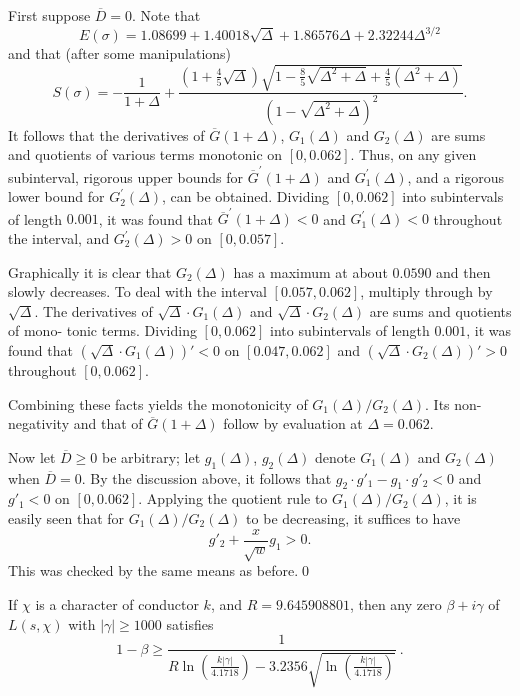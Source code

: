   First suppose  $\overline{D} = 0$.  Note that
$$ E(\sigma) = 1.08699 + 1.40018\sqrt{\Delta} + 1.86576\Delta +
2.32244\Delta^{3/2}
$$ and that (after some manipulations)
$$ S(\sigma) = -\frac{1}{1+\Delta} + \frac{\left(1 +
\frac{4}{5}\sqrt{\Delta}\right)\sqrt{1 -
\frac{8}{5}\sqrt{\Delta^2+\Delta} +
\frac{4}{5}\left(\Delta^2+\Delta\right)}}{\left(1 -
\sqrt{\Delta^2+\Delta}\right)^2}.
$$ It follows that the derivatives of 
$\overline{G}(1+\Delta)$, $G_1(\Delta)$  and 
$G_2(\Delta)$  are sums and quotients of various terms monotonic on 
$[0,0.062]$.  Thus, on any given subinterval, rigorous upper bounds
for  $\overline{G}^{\prime}(1+\Delta)$
 and  $G^{\prime}_1(\Delta)$, and a rigorous lower bound for 
$G^{\prime}_2(\Delta)$, can be obtained.  Dividing  $[0,0.062]$ 
into subintervals of length $0.001$, it was found that 
$\overline{G}^{\prime}(1+\Delta) < 0$ and  
$G^{\prime}_1(\Delta) < 0$  throughout the interval, and 
$G^{\prime}_2(\Delta) > 0$  on  $[0,0.057]$.

Graphically it is clear that  $G_2(\Delta)$  has a maximum at about 
$0.0590$  and then slowly decreases.  To deal with the interval 
$[0.057, 0.062]$, multiply through by 
$\sqrt{\Delta}$.  The derivatives of 
$\sqrt{\Delta}
\cdot G_1(\Delta)$  and  $\sqrt{\Delta} \cdot G_2(\Delta)$  are sums
and quotients of mono-\linebreak
tonic terms.  Dividing  $[0,0.062]$  into
subintervals of length  $0.001$, it was found that
\linebreak 
  $(\sqrt{\Delta}
\cdot G_1(\Delta))' < 0$  on  $[0.047,0.062]$  and  $(\sqrt{\Delta}
\cdot G_2(\Delta))' > 0$  throughout  $[0,0.062]$.

Combining these facts yields the monotonicity of 
$G_1(\Delta)/G_2(\Delta)$.  Its non-\linebreak
negativity and that of 
$\overline{G}(1+\Delta)$ follow by evaluation at  $\Delta = 0.062$.

Now let  $\overline{D} \ge 0$  be arbitrary; let  $g_1(\Delta)$,
$g_2(\Delta)$  denote  $G_1(\Delta)$  and  $G_2(\Delta)$  when 
$\overline{D} = 0$.  By the discussion above, it follows that  $g_2
\cdot g'_1 - g_1\cdot g'_2 < 0$ and  $g'_1 < 0$  on  $[0,0.062]$. 
Applying the quotient rule to  $G_1(\Delta)/G_2(\Delta)$, it is
easily seen that for  $G_1(\Delta)/G_2(\Delta)$  to be decreasing, it
suffices to have
$$ g'_2 + \frac{x}{\sqrt{w}} g_1 > 0 .
$$ This was checked by the same means as before.\qed
\enddemo

  If  $\chi$  is a character of conductor 
$k$, and  $R = 9.645908801$, then any zero  $\beta + i\gamma$  of 
$L(s,\chi)$  with 
$|\gamma| \ge 1000$  satisfies
$$ 1 - \beta \ge \frac{1}{R \ln\left(\frac{k|\gamma|}{4.1718}\right)
- 3.2356 \sqrt{\ln\left(\frac{k|\gamma|}{4.1718}\right)}} \ .
$$
\endproclaim


